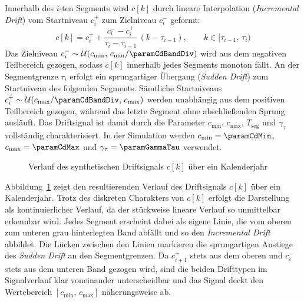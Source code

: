 %
Innerhalb des $i$-ten Segments wird $c[k]$ durch lineare Interpolation (\emph{Incremental Drift}) vom Startniveau $c_i^{+}$ zum Zielniveau $c_i^{-}$ geformt:
%
\begin{equation}
    c[k] = c_i^{+} + \frac{c_i^{-} - c_i^{+}}{\tau_i - \tau_{i-1}}\,(k - \tau_{i-1}),
    \qquad k \in \bigl[\tau_{i-1},\, \tau_i\bigr)
    \label{eq:cd_incremental}
\end{equation}
%
Das Zielniveau $c_i^{-} \sim \mathcal{U}(c_{\min},\, c_{\min}/\paramCdBandDiv)$ wird aus dem negativen Teilbereich gezogen, sodass $c[k]$ innerhalb jedes Segments monoton fällt. An der Segmentgrenze $\tau_i$ erfolgt ein sprungartiger Übergang (\emph{Sudden Drift}) zum Startniveau des folgenden Segments. Sämtliche Startniveaus $c_i^{+} \sim \mathcal{U}(c_{\max}/\paramCdBandDiv,\, c_{\max})$ werden unabhängig aus dem positiven Teilbereich gezogen, während das letzte Segment ohne abschließenden Sprung ausläuft. Das Driftsignal ist damit durch die Parameter $c_{\min}$, $c_{\max}$, $T_{\mathrm{seg}}$ und $\gamma_{\tau}$ vollständig charakterisiert. In der Simulation werden $c_{\min} = \paramCdMin$, $c_{\max} = \paramCdMax$ und $\gamma_{\tau} = \paramGammaTau$ verwendet.
%
\begin{figure}[bt!]
    \centering
    \makebox[\textwidth][c]{%
        
    }
    \caption{Verlauf des synthetischen Driftsignals $c[k]$ über ein Kalenderjahr}
    \label{fig:synthetic_concept_drift}
\end{figure}
%
Abbildung~\ref{fig:synthetic_concept_drift} zeigt den resultierenden Verlauf des Driftsignals $c[k]$ über ein Kalenderjahr. Trotz des diskreten Charakters von $c[k]$ erfolgt die Darstellung als kontinuierlicher Verlauf, da der stückweise lineare Verlauf so unmittelbar erkennbar wird. Jedes Segment erscheint dabei als eigene Linie, die vom oberen zum unteren grau hinterlegten Band abfällt und so den \emph{Incremental Drift} abbildet. Die Lücken zwischen den Linien markieren die sprungartigen Anstiege des \emph{Sudden Drift} an den Segmentgrenzen. Da $c_{i+1}^{+}$ stets aus dem oberen und $c_i^{-}$ stets aus dem unteren Band gezogen wird, sind die beiden Drifttypen im Signalverlauf klar voneinander unterscheidbar und das Signal deckt den Wertebereich $[c_{\min},\, c_{\max}]$ näherungsweise ab.
%
